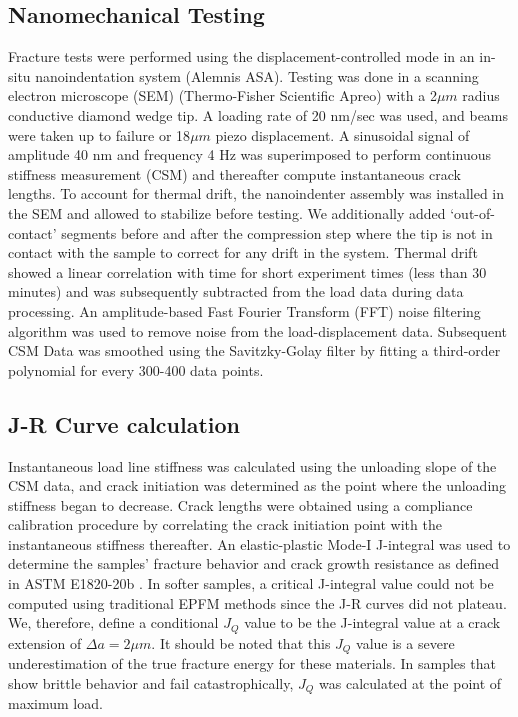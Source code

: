 \documentclass[11pt]{article}
\providecommand{\um}[0]{$\mu m$}
\begin{document}
    \subsection*{Nanomechanical Testing}
        Fracture tests were performed using the displacement-controlled mode in an in-situ nanoindentation system (Alemnis ASA).
        Testing was done in a scanning electron microscope (SEM) (Thermo-Fisher Scientific Apreo) with a 2\um{} radius conductive diamond wedge tip. 
        A loading rate of 20 nm/sec was used, and beams were taken up to failure or 18\um{} piezo displacement. 
        A sinusoidal signal of amplitude 40 nm and frequency 4 Hz was superimposed to perform continuous stiffness measurement (CSM) and thereafter compute instantaneous crack lengths. 
        To account for thermal drift, the nanoindenter assembly was installed in the SEM and allowed to stabilize before testing.
        We additionally added `out-of-contact' segments before and after the compression step where the tip is not in contact with the sample to correct for any drift in the system. 
        Thermal drift showed a linear correlation with time for short experiment times (less than 30 minutes) and was subsequently subtracted from the load data during data processing.
        An amplitude-based Fast Fourier Transform (FFT) noise filtering algorithm was used to remove noise from the load-displacement data. 
        Subsequent CSM Data was smoothed using the Savitzky-Golay filter by fitting a third-order polynomial for every 300-400 data points.

    \subsection*{J-R Curve calculation}
        Instantaneous load line stiffness was calculated using the unloading slope of the CSM data, and crack initiation was determined as the point where the unloading stiffness began to decrease.
        Crack lengths were obtained using a compliance calibration procedure \cite{haggag1984compliance} by correlating the crack initiation point with the instantaneous stiffness thereafter.
        An elastic-plastic Mode-I J-integral was used to determine the samples' fracture behavior and crack growth resistance as defined in ASTM E1820-20b \cite{ASTM-E1820}.
        In softer samples, a critical J-integral value could not be computed using traditional EPFM methods since the J-R curves did not plateau. 
        We, therefore, define a conditional $J_Q$ value to be the J-integral value at a crack extension of $\Delta a=2$\um{}. 
        It should be noted that this $J_Q$ value is a severe underestimation of the true fracture energy for these materials.
        In samples that show brittle behavior and fail catastrophically, $J_Q$ was calculated at the point of maximum load.
\end{document}
